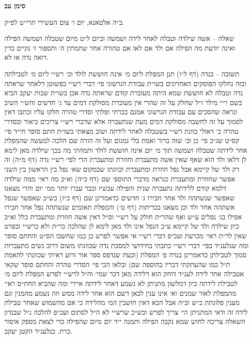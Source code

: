 \documentclass[12pt, openany]{book}
\newcommand{\chapname}{}
\newcommand{\newchap}[1]{
	\addcontentsline{toc}{chapter}{#1}
	\renewcommand{\chapname}{#1}
		\begin{center}
			\textbf{%
\fontsize{16pt}{16pt}\selectfont
				#1}
		\end{center}
}
\begin{document}
\newchap{סימן עב}
\begin{multicols}{2}
ב״ה אלטאנא, יום ו׳ צום העשירי תרי״ט לפ״ק.\\\vspace{0pt}

שאלה – אשה שילדה וטבלה לאחר לידה ושמשה וביום ל״ט מיום שטבלה ושמשה הפילה ואינה יודעת מה הפילה אם ולד אם לאו אם טהורה אחר שתמתין ה׳ ותספור ז׳ נקיים כדין רואה נדה או לא.\\\vspace{0pt}

תשובה – בנדה (דף ל״ו) תנן המפלת ליום מ׳ אינה חוששת לולד וכ׳ רש״י ליום מ׳ לטבילתה ובזה נחלקו הפוסקים האחרונים בשו״ת עבודת הגרשוני פי׳ דברי רש״י כפשוטן דלאחר שראתה נדה וטבלה לא חוששת שמא היתה מעוברת קודם שראתה נדה אכן בשו״ת שבות יעקב הביא בשם ר״י מילר ז״ל שחלק על זה שהרי אין מעוברת מסולקת דמים עד ג׳ חדשים והש״י השיב ונראה שהסכים עם עבודת הגרשוני אמנם בכרתי ופלתי וסדרי טהרה חלקו עליו וכתבו דאין לסמוך על זה לחשבה מסולקת דמים מעת שנתעברה אלא שדברי רש״י צריכים ביאור ובסדרי טהרה כ׳ דאולי כוונת רש״י בשטבלה לאחר לידתה ושוב מצאתי בשו״ת חתם סופר חי״ד סי׳ קס״ט שג״כ פי׳ כן וכ׳ שזה ברור ואמת בלי גמגום ועל זה הורה שם הלכה למעשה שהמפלת אחר לידתה שטבלה ושמשה תוך מ׳ יום אינה חוששת לולד ותמהתי מה בכך שילדה מאן לימא לן דלאו ולד הוא שאף שאין אשה מתעברת וחוזרת ומתעברת הרי לפי׳ רש״י נדה (דף מ״ה) זה רק ולד של קיימא אבל נפל חוזרת ומתעברת וכוונתו שבמקום שא׳ נפל בין הראשון בין השני אפשר שחוזרת ומתעברת כנראה מדברי התוספ׳ שם (דף כ״ה) וא״כ מה ראי׳ ממה שילדה דלמא קודם ללידתה נתעברה שנית והפילה עכשיו וכבר עברו יותר ממ׳ יום והרי מצאנו שאפשר שנשתהה ולד אחר חבירו ג׳ חדשים כדאמרינן שם (דף כ״ז) כש״כ שאפשר שנפל אשתהה אחר ולד וכן מצאנו בכריתות (דף ט׳) והמפלת תאומים שנשתהה נפל אחר חבירו אפילו בג׳ נפלים ע״ש ואף שהר״ת חולק על רש״י וס״ל דאין אשה חוזרת ומתעברת כלל וא״כ כיון שילדה ולד של קיימא ע״כ הנפל אינו ולד מאן לימא לן שהלכה כר״ת ולא כרש״י ובפרט שאין לר״ת ראי׳ מכרעת ועכ״פ דברי רש״י אי אפשר לפרש כן כמו שחשבו הס״ט והחתם סופר ומה שנלענ״ד בפי׳ דברי רש״י כתבתי בחידושי למסכת נדה שכוונתו משום דרוב נשים מתעברות סמוך לטבילתן כדאמרינן בנדה פ׳ המפלת (וכעת שנדפס ספר אור זרוע ראיתי שכוונתי להאמת ת״ל כמו שהעתקתי דבריו בהוספה שם) ובלאו הכי פי׳ הסדרי טהרה והחתם סופר שקאי אטבילה אחר לידה לענ״ד דוחק הוא דלידה מאן דכר שמי׳ וה״ל לרש״י לפרש המפלת ליום מ׳ לטבילת לידתה כיון דמלשון מתניתן לא נשמע דאחר לידתה איירי ומה שהביא החת״ס ראי׳ מהמפלת לאור שמנים וא׳ אינו ענין לכאן דשם הוא אחר לידה ממש וזה נשמע מהמנין וגם מענין פלוגתת ב״ש וב״ה אבל הכא דאין חושבין המ׳ מהלידה כי אם מהשמוש שאחר טבילת לידה זה ודאי המתניתן הי׳ צריך לפרש וכש״כ שרש״י לא ה״ל לסתום ועכ״פ להלכה נ״ל שבנדון השאלה צריכה לחוש שמא נקבה הפילה ותמנה י״ד יום מיום שהפילה כדי לצאת מספק איסור כרת. כנלענ״ד הקטן יעקב.\\\vspace{0pt}

\end{multicols}\newpage
\end{document}
